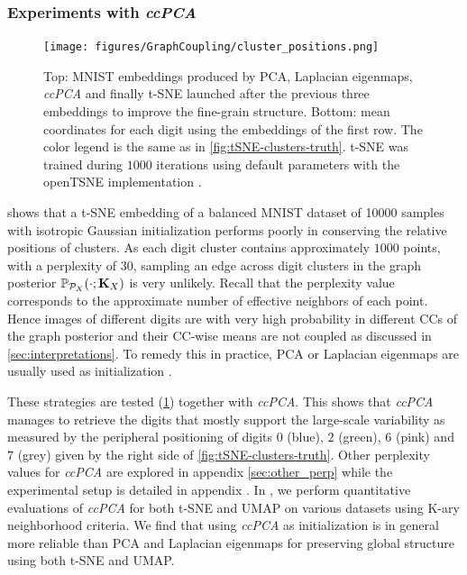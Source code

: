 \subsubsection{Experiments with \textit{ccPCA}}\label{sec:ccPCA}

\begin{figure}[t]
\begin{center}
\centerline{\texttt{[image: figures/GraphCoupling/cluster\_positions.png]}}
\caption{Top: MNIST embeddings produced by PCA, Laplacian eigenmaps, \textit{ccPCA} and finally t-SNE launched after the previous three embeddings to improve the fine-grain structure. Bottom: mean coordinates for each digit using the embeddings of the first row. The color legend is the same as in \cref{fig:tSNE-clusters-truth}. t-SNE was trained during $1000$ iterations using default parameters with the openTSNE implementation \citep{polivcar2019opentsne}.}
\label{fig:methods_embeddings}
\end{center}
\end{figure}

 shows that a t-SNE embedding of a balanced MNIST dataset of 10000 samples \citep{deng2012mnist} with isotropic Gaussian initialization performs poorly in conserving the relative positions of clusters. As each digit cluster contains approximately $1000$ points, with a perplexity of $30$, sampling an edge across digit clusters in the graph posterior $\mathbb{P}_{\mathcal{P}_X}(\cdot;\mathbf{K}_{X})$ is very unlikely. Recall that the perplexity value \citep{maaten2008tSNE} corresponds to the approximate number of effective neighbors of each point. Hence images of different digits are with very high probability in different CCs of the graph posterior and their CC-wise means are not coupled as discussed in \cref{sec:interpretations}. To remedy this in practice, PCA or Laplacian eigenmaps are usually used as initialization \citep{kobak2021initialization}. 

These strategies are tested (\cref{fig:methods_embeddings}) together with \textit{ccPCA}. This shows that 
\textit{ccPCA} manages to retrieve the digits that mostly support the large-scale variability as measured by the peripheral positioning of digits $0$ (blue), $2$ (green), $6$ (pink) and $7$ (grey) given by the right side of \cref{fig:tSNE-clusters-truth}. Other perplexity values for \textit{ccPCA} are explored in appendix \ref{sec:other_perp} while the experimental setup is detailed in appendix . In , we perform quantitative evaluations of \textit{ccPCA} for both t-SNE and UMAP on various datasets using K-ary neighborhood criteria. We find that using \textit{ccPCA} as initialization is in general more reliable than PCA and Laplacian eigenmaps for preserving global structure using both t-SNE and UMAP. 

